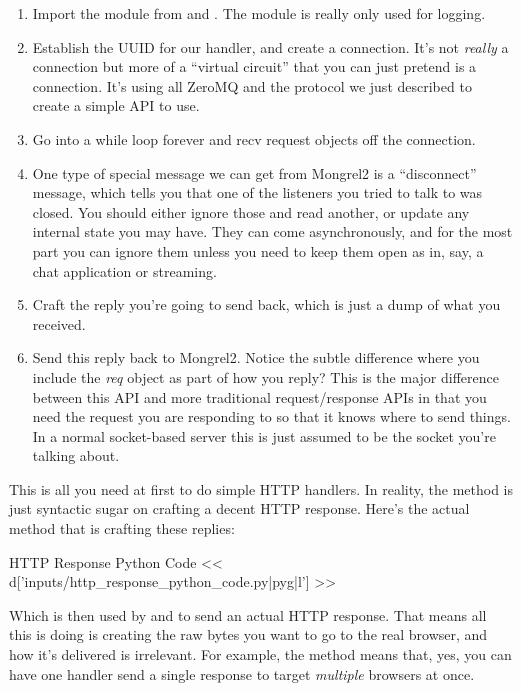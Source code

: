 \begin{enumerate}
\item Import the  module from  and .  The  module is
    really only used for logging.
\item Establish the UUID for our handler, and create a connection.  It's not \emph{really} a connection
    but more of a ``virtual circuit'' that you can just pretend is a connection.  It's using all ZeroMQ and
    the protocol we just described to create a simple API to use.
\item Go into a while loop forever and recv request objects off the connection.
\item One type of special message we can get from Mongrel2 is a ``disconnect'' message, which tells you that
    one of the listeners you tried to talk to was closed.  You should either ignore those and read
    another, or update any internal state you may have.  They can come asynchronously, and for the most
    part you can ignore them unless you need to keep them open as in, say, a chat application or streaming.
\item Craft the reply you're going to send back, which is just a dump of what you received.
\item Send this reply back to Mongrel2.  Notice the subtle difference where you include the \emph{req} object
    as part of how you reply?  This is the major difference between this API and more traditional
    request/response APIs in that you need the request you are responding to so that it knows where to send
    things.  In a normal socket-based server this is just assumed to be the socket you're talking about.
\end{enumerate}

This is all you need at first to do simple HTTP handlers.  In reality, the  method is
just syntactic sugar on crafting a decent HTTP response.  Here's the actual method that is crafting these replies:

\begin{code}{HTTP Response Python Code}
<< d['inputs/http_response_python_code.py|pyg|l'] >>
\end{code}

Which is then used by  and
 to send an actual HTTP response.  That
means all this is doing is creating the raw bytes you want to go
to the real browser, and how it's delivered is irrelevant.  For example,
the  method means that, yes, you can have one
handler send a single response to target \emph{multiple} browsers
at once.


